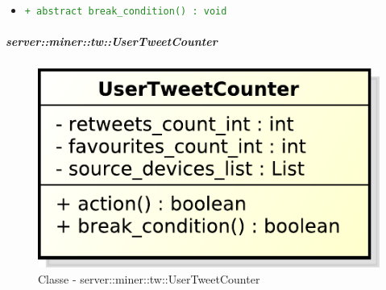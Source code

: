 \begin{itemize}
\begin{itemize}
						\item \textcolor{forestgreen}{\texttt{+ abstract break\_condition() : void}}
					\end{itemize}
			\end{itemize}

	\subparagraph{server::miner::tw::UserTweetCounter} %
		\label{subp:server_miner_tw_UserTweetCounter}
		    \begin{figure}[!htbp]
 		 		\centering
 				\centerline{\includegraphics[scale=0.75]{./images/server/classes/miner/user_tweet_counter.pdf}}
 				\caption{Classe - server::miner::tw::UserTweetCounter}
			\end{figure}
